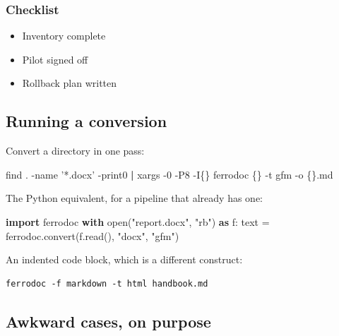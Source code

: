 \documentclass{article}
\providecommand{\tightlist}{%
  \setlength{\itemsep}{0pt}\setlength{\parskip}{0pt}}
\newenvironment{Shaded}{}{}
\newcommand{\AttributeTok}[1]{\textcolor[rgb]{0.49,0.56,0.16}{#1}}
\newcommand{\BuiltInTok}[1]{\textcolor[rgb]{0.00,0.50,0.00}{#1}}
\newcommand{\ControlFlowTok}[1]{\textcolor[rgb]{0.00,0.44,0.13}{\textbf{#1}}}
\newcommand{\FunctionTok}[1]{\textcolor[rgb]{0.02,0.16,0.49}{#1}}
\newcommand{\ImportTok}[1]{\textcolor[rgb]{0.00,0.50,0.00}{\textbf{#1}}}
\newcommand{\KeywordTok}[1]{\textcolor[rgb]{0.00,0.44,0.13}{\textbf{#1}}}
\newcommand{\NormalTok}[1]{#1}
\newcommand{\OperatorTok}[1]{\textcolor[rgb]{0.40,0.40,0.40}{#1}}
\newcommand{\StringTok}[1]{\textcolor[rgb]{0.25,0.44,0.63}{#1}}
\begin{document}
\subsubsection{Checklist}\label{checklist}

\begin{itemize}
\tightlist
\item[$\boxtimes$]
  Inventory complete
\item[$\square$]
  Pilot signed off
\item[$\square$]
  Rollback plan written
\end{itemize}

\subsection{Running a conversion}\label{running-a-conversion}

Convert a directory in one pass:

\begin{Shaded}
\begin{Highlighting}[]
\FunctionTok{find}\NormalTok{ . }\AttributeTok{-name} \StringTok{'*.docx'} \AttributeTok{-print0} \KeywordTok{|}
  \FunctionTok{xargs} \AttributeTok{-0} \AttributeTok{-P8} \AttributeTok{-I\{\}}\NormalTok{ ferrodoc \{\} }\AttributeTok{-t}\NormalTok{ gfm }\AttributeTok{-o}\NormalTok{ \{\}.md}
\end{Highlighting}
\end{Shaded}

The Python equivalent, for a pipeline that already has one:

\begin{Shaded}
\begin{Highlighting}[]
\ImportTok{import}\NormalTok{ ferrodoc}
\ControlFlowTok{with} \BuiltInTok{open}\NormalTok{(}\StringTok{"report.docx"}\NormalTok{, }\StringTok{"rb"}\NormalTok{) }\ImportTok{as}\NormalTok{ f:}
\NormalTok{    text }\OperatorTok{=}\NormalTok{ ferrodoc.convert(f.read(), }\StringTok{"docx"}\NormalTok{, }\StringTok{"gfm"}\NormalTok{)}
\end{Highlighting}
\end{Shaded}

An indented code block, which is a different construct:

\begin{verbatim}
ferrodoc -f markdown -t html handbook.md
\end{verbatim}

\subsection{Awkward cases, on purpose}\label{awkward-cases-on-purpose}
\end{document}
